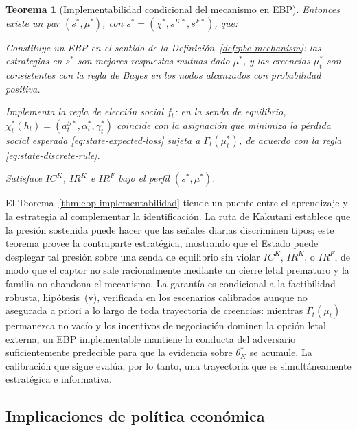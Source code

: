 \documentclass[review,authoryear,12pt]{elsarticle}
\theoremstyle{plain}
\newtheorem{theorem}{Teorema}
\theoremstyle{definition}
\newcommand{\1}{\mathbf{1}}
\begin{document}
\begin{theorem}[Implementabilidad condicional del mecanismo en EBP]
Entonces existe un par $(s^\ast,\mu^\ast)$, con $s^\ast=({\chi}^\ast,s^{K\ast},s^{F\ast})$, que:
\begin{list}{}{\setlength{\labelwidth}{2.0em}\setlength{\labelsep}{0.7em}\setlength{\leftmargin}{2.7em}\setlength{\itemindent}{0pt}\setlength{\listparindent}{0pt}\setlength{\parsep}{0pt}\setlength{\itemsep}{0.25\baselineskip}}
    \item[\textup{(a)}] Constituye un EBP en el sentido de la Definición~\ref{def:pbe-mechanism}: las estrategias en $s^\ast$ son mejores respuestas mutuas dado $\mu^\ast$, y las creencias $\mu_t^\ast$ son consistentes con la regla de Bayes en los nodos alcanzados con probabilidad positiva.
    \item[\textup{(b)}] Implementa la regla de elección social $f_t$: en la senda de equilibrio, $\chi_t^\ast(h_t)=(a_t^{S\ast},\alpha_t^\ast,\gamma_t^\ast)$ coincide con la asignación que minimiza la pérdida social esperada \eqref{eq:state-expected-loss} sujeta a $\Gamma_t(\mu_t^\ast)$, de acuerdo con la regla \eqref{eq:state-discrete-rule}.
    \item[\textup{(c)}] Satisface $IC^K$, $IR^K$ e $IR^F$ bajo el perfil $(s^\ast,\mu^\ast)$.
\end{list}
\end{theorem}

\noindent El Teorema~\ref{thm:ebp-implementabilidad} tiende un puente entre el aprendizaje y la estrategia al complementar la identificación. La ruta de Kakutani establece que la presión sostenida puede hacer que las señales diarias discriminen tipos; este teorema provee la contraparte estratégica, mostrando que el Estado puede desplegar tal presión sobre una senda de equilibrio sin violar $IC^K$, $IR^K$, o $IR^F$, de modo que el captor no sale racionalmente mediante un cierre letal prematuro y la familia no abandona el mecanismo. La garantía es condicional a la factibilidad robusta, hipótesis~(v), verificada en los escenarios calibrados aunque no asegurada a priori a lo largo de toda trayectoria de creencias: mientras $\Gamma_t(\mu_t)$ permanezca no vacío y los incentivos de negociación dominen la opción letal externa, un EBP implementable mantiene la conducta del adversario suficientemente predecible para que la evidencia sobre $\theta_K^\ast$ se acumule. La calibración que sigue evalúa, por lo tanto, una trayectoria que es simultáneamente estratégica e informativa.

\subsection{Implicaciones de política económica}\label{subsec:implicaciones-politica}
\end{document}
